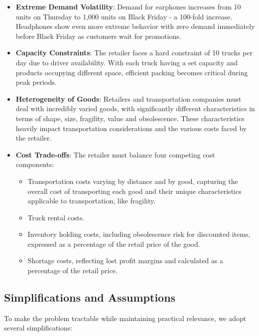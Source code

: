 \documentclass[a4paper,12pt]{article}
\begin{document}
\begin{itemize}
    \item \textbf{Extreme Demand Volatility}: Demand for earphones increases from 10 units on Thursday to 1,000 units on Black Friday - a 100-fold increase.
Headphones show even more extreme behavior with zero demand immediately before Black Friday as customers wait for promotions.
    \item \textbf{Capacity Constraints}: The retailer faces a hard constraint of 10 trucks per day due to driver availability.
With each truck having a set capacity and products occupying different space, efficient packing becomes critical during peak periods.
    \item \textbf{Heterogeneity of Goods}: Retailers and transportation companies must deal with incredibly varied goods, with significantly different characteristics in terms of shape, size, fragility, value and obsolescence.
These characteristics heavily impact transportation considerations and the various costs faced by the retailer.
    \item \textbf{Cost Trade-offs}: The retailer must balance four competing cost components:
    \begin{itemize}
        \item Transportation costs varying by distance and by good, capturing the overall cost of transporting each good and their unique characteristics applicable to transportation, like fragility.
        \item Truck rental costs.
        \item Inventory holding costs, including obsolescence risk for discounted items, expressed as a percentage of the retail price of the good.
        \item Shortage costs, reflecting lost profit margins and calculated as a percentage of the retail price.
    \end{itemize}
\end{itemize}

\subsection{Simplifications and Assumptions}\label{subsec:simplifications-and-assumptions}

To make the problem tractable while maintaining practical relevance, we adopt several simplifications:
\end{document}

